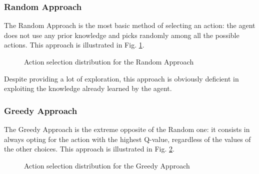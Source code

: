 \documentclass[a4paper, 12pt]{article}
\numberwithin{equation}{section}
\begin{document}
\subsubsection{Random Approach}

The Random Approach is the most basic method of selecting an action: the agent does not use any prior knowledge and picks randomly among all the possible actions. This approach is illustrated in Fig. \ref{fig:random}.

\begin{figure}[h]
	\centering
		\caption{Action selection distribution for the Random Approach}
	\label{fig:random}
\end{figure}

Despite providing a lot of exploration, this approach is obviously deficient in exploiting the knowledge already learned by the agent.


\subsubsection{Greedy Approach}

The Greedy Approach is the extreme opposite of the Random one: it consists in always opting for the action with the highest Q-value, regardless of the values of the other choices. This approach is illustrated in Fig. \ref{fig:greedy}.

\begin{figure}[h]
	\centering
		\caption{Action selection distribution for the Greedy Approach}
	\label{fig:greedy}
\end{figure}
\end{document}
